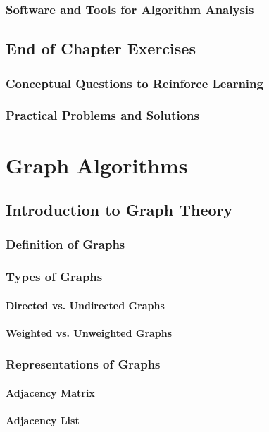 \documentclass[12pt]{book} %
\begin{document}
\subsection{Software and Tools for Algorithm Analysis}

\section{End of Chapter Exercises}
\subsection{Conceptual Questions to Reinforce Learning}
\subsection{Practical Problems and Solutions}

\chapter{Graph Algorithms}

\section{Introduction to Graph Theory}
\subsection{Definition of Graphs}
\subsection{Types of Graphs}
\subsubsection{Directed vs. Undirected Graphs}
\subsubsection{Weighted vs. Unweighted Graphs}
\subsection{Representations of Graphs}
\subsubsection{Adjacency Matrix}
\subsubsection{Adjacency List}
\end{document}
